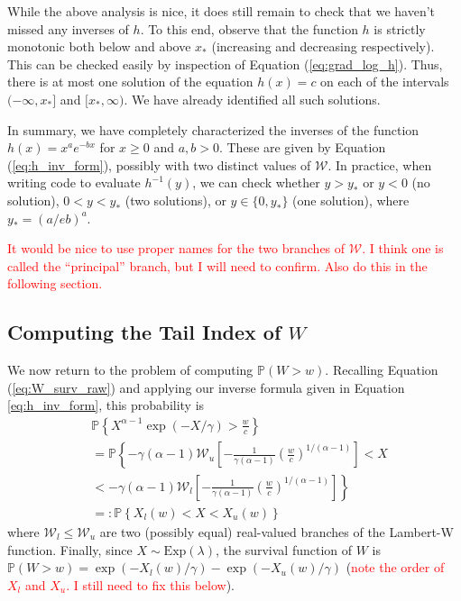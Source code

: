\documentclass{article}
\newcommand{\bP}{\mathbb{P}}
\newcommand{\sW}{\mathscr{W}}
\begin{document}
While the above analysis is nice, it does still remain to check that we haven't missed any inverses of $h$. To this end, observe that the function $h$ is strictly monotonic both below and above $x_*$ (increasing and decreasing respectively). This can be checked easily by inspection of Equation (\ref{eq:grad_log_h}). Thus, there is at most one solution of the equation $h(x) = c$ on each of the intervals $(-\infty, x_*]$ and $[x_*, \infty)$. We have already identified all such solutions.

In summary, we have completely characterized the inverses of the function $h(x) = x^a e^{-bx}$ for $x\geq 0$ and $a, b > 0$. These are given by Equation (\ref{eq:h_inv_form}), possibly with two distinct values of $\sW$. In practice, when writing code to evaluate $h^{-1}(y)$, we can check whether $y > y_*$ or $y < 0$ (no solution), $0 < y < y_*$ (two solutions), or $y \in \{ 0, y_* \}$ (one solution), where $y_* = (a/eb)^a$.

\textcolor{red}{It would be nice to use proper names for the two branches of $\sW$. I think one is called the ``principal'' branch, but I will need to confirm. Also do this in the following section.}

\subsection{Computing the Tail Index of $W$}

We now return to the problem of computing $\bP(W > w)$. Recalling Equation (\ref{eq:W_surv_raw}) and applying our inverse formula given in Equation \ref{eq:h_inv_form}, this probability is
%
\begin{align}
    &\bP \left\{ X^{\alpha - 1} \exp(-X / \gamma) > \frac{w}{c} \right\} \\
    &=\bP \left\{ -\gamma (\alpha - 1) \sW_u \left[ - \frac{1}{\gamma (\alpha - 1)} \left( \frac{w}{c} \right)^{1/(\alpha - 1)} \right] < X  \right. \\
    &\left. < -\gamma (\alpha - 1) \sW_l \left[ - \frac{1}{\gamma (\alpha - 1)} \left( \frac{w}{c} \right)^{1/(\alpha - 1)} \right]\right\}\\
    &=: \bP \left\{ X_l(w) < X < X_u(w) \right\}
\end{align}
%
where $\sW_l \leq \sW_u$ are two (possibly equal) real-valued branches of the Lambert-W function. Finally, since $X \sim \mathrm{Exp}(\lambda)$, the survival function of $W$ is $\bP(W > w) = \exp(-X_l(w)/ \gamma) - \exp(-X_u(w)/\gamma)$ (\textcolor{red}{note the order of $X_l$ and $X_u$. I still need to fix this below}).
\end{document}

